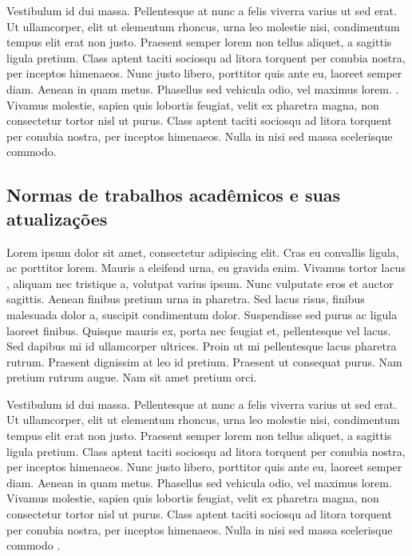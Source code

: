 \documentclass[12pt,a4paper]{article}
\begin{document}
Vestibulum id dui massa. Pellentesque at nunc a felis viverra varius ut sed erat. Ut ullamcorper, elit ut elementum rhoncus, urna leo molestie nisi, condimentum tempus elit erat non justo. Praesent semper lorem non tellus aliquet, a sagittis ligula pretium. Class aptent taciti sociosqu ad litora torquent per conubia nostra, per inceptos himenaeos. Nunc justo libero, porttitor quis ante eu, laoreet semper diam. Aenean in quam metus. Phasellus sed vehicula odio, vel maximus lorem.  \cite{ufsc2022abnt}. Vivamus molestie, sapien quis lobortis feugiat, velit ex pharetra magna, non consectetur tortor nisl ut purus. Class aptent taciti sociosqu ad litora torquent per conubia nostra, per inceptos himenaeos. Nulla in nisi sed massa scelerisque commodo.

\subsection{Normas de trabalhos acadêmicos e suas atualizações}

Lorem ipsum dolor sit amet, consectetur adipiscing elit. Cras eu convallis ligula, ac porttitor lorem. Mauris a eleifend urna, eu gravida enim. Vivamus tortor lacus  \textcite[p. 71]{sperandio2019}, aliquam nec tristique a, volutpat varius ipsum. Nunc vulputate eros et auctor sagittis. Aenean finibus pretium urna in pharetra. Sed lacus risus, finibus malesuada dolor a, suscipit condimentum dolor. Suspendisse sed purus ac ligula laoreet finibus. Quisque mauris ex, porta nec feugiat et, pellentesque vel lacus. Sed dapibus mi id ullamcorper ultrices. Proin ut mi pellentesque lacus pharetra rutrum. Praesent dignissim at leo id pretium. Praesent ut consequat purus. Nam pretium rutrum augue. Nam sit amet pretium orci.

Vestibulum id dui massa. Pellentesque at nunc a felis viverra varius ut sed erat. Ut ullamcorper, elit ut elementum rhoncus, urna leo molestie nisi, condimentum tempus elit erat non justo. Praesent semper lorem non tellus aliquet, \textcite{nbr10520_2023} a sagittis ligula pretium. Class aptent taciti sociosqu ad litora torquent per conubia nostra, per inceptos himenaeos. Nunc justo libero, porttitor quis ante eu, laoreet semper diam. Aenean in quam metus. Phasellus sed vehicula odio, vel maximus lorem. Vivamus molestie, sapien quis lobortis feugiat, velit ex pharetra magna, non consectetur tortor nisl ut purus. Class aptent taciti sociosqu ad litora torquent per conubia nostra, per inceptos himenaeos. Nulla in nisi sed massa scelerisque commodo  \cite{nbr10520_2023}.
\end{document}
